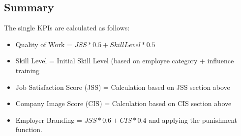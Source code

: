 \subsection{Summary}

The single KPIs are calculated as follows: 
\begin{itemize}
\item Quality of Work = $JSS * 0.5 + SkillLevel * 0.5$
\item Skill Level = Initial Skill Level (based on employee category + influence training
\item Job Satisfaction Score (JSS) = Calculation based on JSS section above
\item Company Image Score (CIS) = Calculation based on CIS section above
\item Employer Branding = $JSS*0.6 + CIS*0.4$ and applying the punishment function. 
\end{itemize}